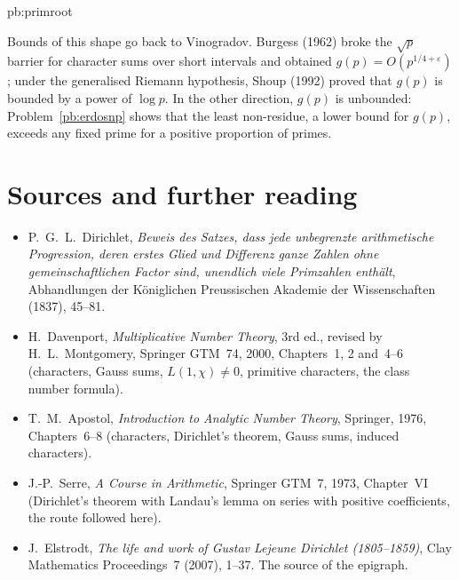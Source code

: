\begin{solution}{pb:primroot}

\leads Bounds of this shape go back to Vinogradov. Burgess (1962) broke the $\sqrt p$ barrier for character sums over short intervals and obtained
$g(p)=O(p^{1/4+\varepsilon})$; under the generalised Riemann hypothesis, Shoup (1992) proved that $g(p)$ is bounded by a power of $\log p$. In the other direction, $g(p)$ is
unbounded: Problem~\ref{pb:erdosnp} shows that the least non-residue, a lower bound for $g(p)$, exceeds any fixed prime for a positive proportion of primes.
\end{solution}

\section*{Sources and further reading}

\begin{itemize}
\item P.~G.~L.~Dirichlet, \emph{Beweis des Satzes, dass jede unbegrenzte arithmetische Progression, deren erstes Glied und Differenz ganze
Zahlen ohne gemeinschaftlichen Factor sind, unendlich viele Primzahlen enthält}, Abhandlungen der Königlichen Preussischen Akademie
der Wissenschaften (1837), 45--81.
\item H.~Davenport, \emph{Multiplicative Number Theory}, 3rd ed., revised by H.~L.~Montgomery, Springer GTM~74, 2000, Chapters~1, 2 and~4--6
(characters, Gauss sums, $L(1,\chi)\ne0$, primitive characters, the class number formula).
\item T.~M.~Apostol, \emph{Introduction to Analytic Number Theory}, Springer, 1976, Chapters~6--8 (characters, Dirichlet's theorem, Gauss sums, induced
characters).
\item J.-P.~Serre, \emph{A Course in Arithmetic}, Springer GTM~7, 1973, Chapter~VI (Dirichlet's theorem with Landau's lemma on series with
positive coefficients, the route followed here).
\item J.~Elstrodt, \emph{The life and work of Gustav Lejeune Dirichlet (1805--1859)}, Clay Mathematics Proceedings~7 (2007), 1--37. The source
of the epigraph.
\end{itemize}
